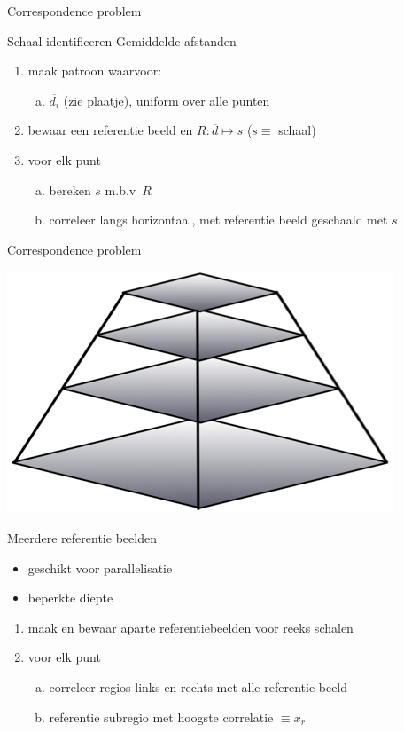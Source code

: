 \begin{frame}{Correspondence problem}
\centerline{}
\begin{block}{Schaal identificeren}
Gemiddelde afstanden
\end{block}
\pause
\begin{enumerate}
\item<+-> maak patroon waarvoor: 
\begin{enumerate}[a.]
\item<+-> $\overline{d_i}$ (zie plaatje), uniform over alle punten
\end{enumerate}
\item<+-> bewaar een referentie beeld en $R:\overline{d}\mapsto s$ ($s \equiv$ schaal)
\item<+-> voor elk punt
\begin{enumerate}[a.]
\item<+-> bereken $s$ m.b.v\ $R$
\item<+-> correleer langs horizontaal, met referentie beeld geschaald met $s$
\end{enumerate}
\end{enumerate}
\end{frame}

\begin{frame}{Correspondence problem}
\centerline{\includegraphics[scale=0.25]{images/pyramid}}
\begin{block}{Meerdere referentie beelden}
\begin{itemize}
\item geschikt voor parallelisatie
\item beperkte diepte
\end{itemize}
\end{block}
\pause
\begin{enumerate}
\item<+-> maak en bewaar aparte referentiebeelden voor reeks schalen
\item<+-> voor elk punt
\begin{enumerate}[a.]
\item<+-> correleer regios links en rechts met alle referentie beeld
\item<+-> referentie subregio met hoogste correlatie $\equiv x_r$
\end{enumerate}
\end{enumerate}
\end{frame}
